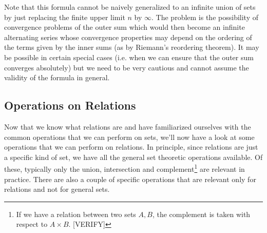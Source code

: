 \medskip
Note that this formula cannot be naively generalized to an infinite union of sets by just replacing the finite upper limit $n$ by $\infty$. The problem is the possibility of convergence problems of the outer sum which would then become an infinite alternating series whose convergence properties may depend on the ordering of the terms given by the inner sums (as by Riemann's reordering theorem). It may be possible in certain special cases (i.e. when we can ensure that the outer sum converges absolutely) but we need to be very cautious and cannot assume the validity of the formula in general.












\subsection{Operations on Relations}
Now that we know what relations are and have familiarized ourselves with the common operations that we can perform on sets, we'll now have a look at some operations that we can perform on relations. In principle, since relations are just a specific kind of set, we have all the general set theoretic operations available. Of these, typically only the union, intersection and complement\footnote{If we have a relation between two sets $A,B$, the complement is taken with respect to $A \times B$. [VERIFY]} are relevant in practice. There are also a couple of specific operations that are relevant only for relations and not for general sets.

